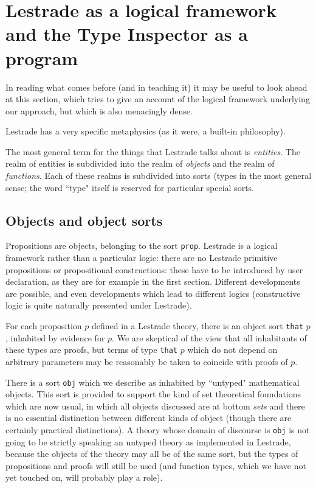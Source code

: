 \documentclass[12pt]{article}
\begin{document}
\newpage

\section{Lestrade as a logical framework and the Type Inspector as a program}

In reading what comes before (and in teaching it) it may be useful to look ahead at this section, which tries to give an account of the logical framework underlying our approach, but which is also menacingly dense.

Lestrade has a very specific metaphysics (as it were, a built-in philosophy).

The most general term for the things that Lestrade talks about is {\em entities\/}.  The realm of entities is subdivided into the realm of {\em objects\/} and the realm of {\em functions\/}.  Each of these realms is subdivided into sorts (types in the most general sense;  the word ``type" itself is reserved for particular special sorts.

\subsection{Objects and object sorts}

Propositions are objects, belonging to the sort {\tt prop}.  Lestrade is a logical framework rather than a particular logic:  there are no Lestrade primitive propositions or propositional constructions:  these have to be introduced by user declaration, as they are for example in the first section.  Different developments are possible, and even developments which lead to different logics (constructive logic is quite naturally presented under Lestrade).

For each proposition $p$ defined in a Lestrade theory, there is an object sort {\tt that} $p$, inhabited by evidence for $p$.   We are skeptical of the view that all inhabitants of these types are proofs, but terms of type {\tt that} $p$ which do not depend on arbitrary parameters may be reasonably be taken to coincide with proofs of $p$.

There is a sort {\tt obj} which we describe as inhabited by ``untyped" mathematical objects.  This sort is provided to support the kind of set theoretical foundations which are now usual, in which all objects discussed are at bottom {\em sets\/} and there is no essential distinction between different kinds of object (though there are certainly practical distinctions).  A theory whose domain of discourse is {\tt obj} is not going to be strictly speaking an untyped theory as implemented in Lestrade, because the objects of the theory may all be of the same sort, but the types of propositions and proofs will still be used (and function types, which we have not yet touched on, will probably play a role).
\end{document}
